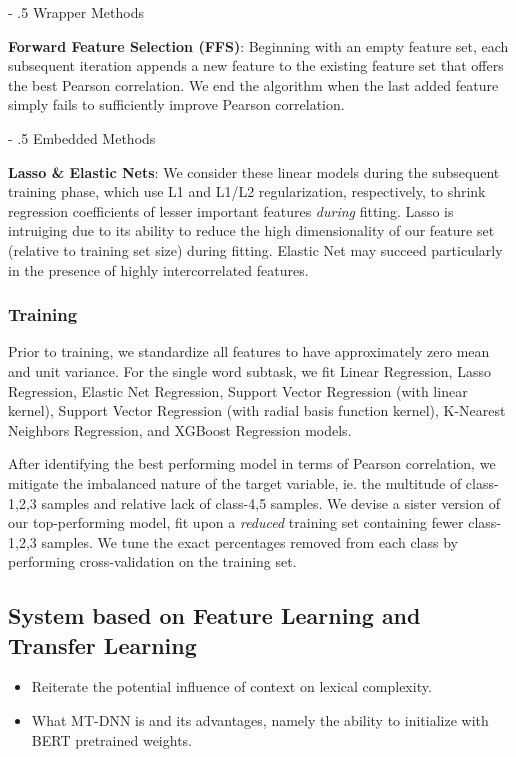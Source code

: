 \documentclass[11pt,a4paper]{article}
\makeatletter
\renewcommand\paragraph{%
    \@startsection{paragraph}{4}{0mm}%
        {-\baselineskip}%
        {.5\baselineskip}%
        {\normalfont\normalsize\bfseries}}
\makeatother
\begin{document}
\paragraph{Wrapper Methods}

\textbf{Forward Feature Selection (FFS)}: Beginning with an empty feature set, each subsequent iteration appends a new feature to the existing feature set that offers the best Pearson correlation. We end the algorithm when the last added feature simply fails to sufficiently improve Pearson correlation.

\paragraph{Embedded Methods}

\textbf{Lasso \& Elastic Nets}: We consider these linear models during the subsequent training phase, which use L1 and L1/L2 regularization, respectively, to shrink regression coefficients of lesser important features \textit{during} fitting. Lasso \citep{Tibshirani.x} is intruiging due to its ability to reduce the high dimensionality of our feature set (relative to training set size) during fitting. Elastic Net \citep{10.2307/3647580} may succeed particularly in the presence of highly intercorrelated features.

\subsubsection{Training}

Prior to training, we standardize all features to have approximately zero mean and unit variance. For the single word subtask, we fit Linear Regression, Lasso Regression, Elastic Net Regression, Support Vector Regression (with linear kernel),  Support Vector Regression (with radial basis function kernel), K-Nearest Neighbors Regression, and XGBoost Regression models. 

After identifying the best performing model in terms of Pearson correlation, we mitigate the imbalanced nature of the target variable, ie. the multitude of class-1,2,3 samples and relative lack of class-4,5 samples. We devise a sister version of our top-performing model, fit upon a \textit{reduced} training set containing fewer class-1,2,3 samples. We tune the exact percentages removed from each class by performing cross-validation on the training set.

\subsection{System based on Feature Learning and Transfer Learning}
\begin{itemize}
  \item Reiterate the potential influence of context on lexical complexity.
  \item What MT-DNN is and its advantages, namely the ability to initialize with BERT pretrained weights.
\end{itemize}
\end{document}
